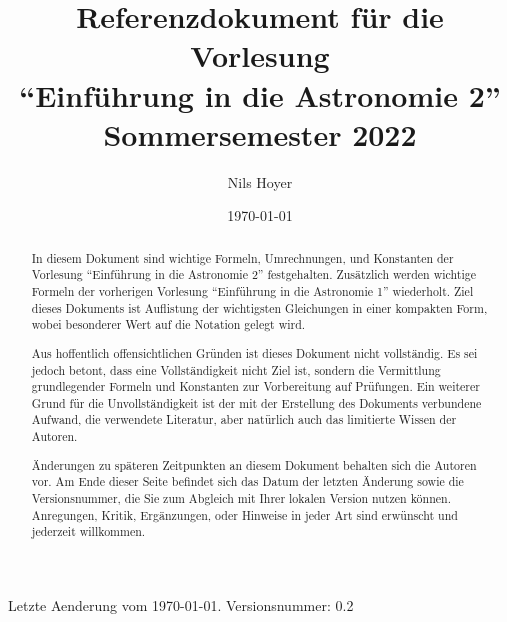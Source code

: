 \documentclass[a4paper,11pt]{article}
\author{Nils Hoyer}
\date{\today}
\title{%
  Referenzdokument für die Vorlesung\\ ``Einführung in die Astronomie 2''\\[10pt]
  \large
  Sommersemester 2022
}
\begin{document}
\thispagestyle{empty}
\maketitle


\begin{abstract}
In diesem Dokument sind wichtige Formeln, Umrechnungen, und Konstanten der Vorlesung ``Einführung in die Astronomie 2'' festgehalten.
Zusätzlich werden wichtige Formeln der vorherigen Vorlesung ``Einführung in die Astronomie 1'' wiederholt.
Ziel dieses Dokuments ist Auflistung der wichtigsten Gleichungen in einer kompakten Form, wobei besonderer Wert auf die Notation gelegt wird.

Aus hoffentlich offensichtlichen Gründen ist dieses Dokument nicht vollständig.
Es sei jedoch betont, dass eine Vollständigkeit nicht Ziel ist, sondern die Vermittlung grundlegender Formeln und Konstanten zur Vorbereitung auf Prüfungen.
Ein weiterer Grund für die Unvollständigkeit ist der mit der Erstellung des Dokuments verbundene Aufwand, die verwendete Literatur, aber natürlich auch das limitierte Wissen der Autoren.

Änderungen zu späteren Zeitpunkten an diesem Dokument behalten sich die Autoren vor.
Am Ende dieser Seite befindet sich das Datum der letzten Änderung sowie die Versionsnummer, die Sie zum Abgleich mit Ihrer lokalen Version nutzen können.
Anregungen, Kritik, Ergänzungen, oder Hinweise in jeder Art sind erwünscht und jederzeit willkommen.
\end{abstract}


\vfill

Letzte Aenderung vom \today.
\hfill
Versionsnummer: 0.2





\end{document}
